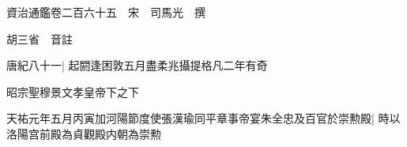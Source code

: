 






























































資治通鑑卷二百六十五　宋　司馬光　撰

胡三省　音註

唐紀八十一|{
	起閼逢困敦五月盡柔兆攝提格凡二年有奇}


昭宗聖穆景文孝皇帝下之下

天祐元年五月丙寅加河陽節度使張漢瑜同平章事帝宴朱全忠及百官於崇勲殿|{
	時以洛陽宫前殿為貞觀殿内朝為崇勲}


